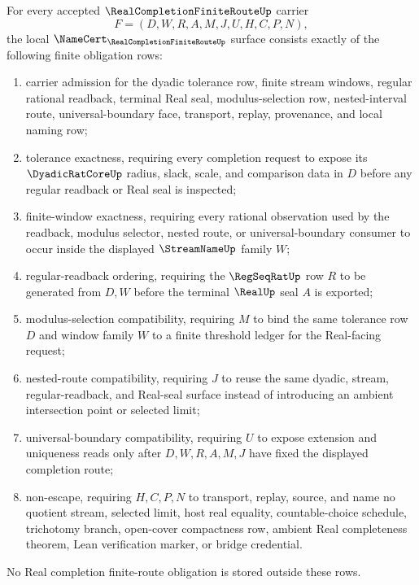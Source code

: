 \begin{theorem}
\label{thm:real-completion-finite-route-namecert-obligations}
For every accepted $\RealCompletionFiniteRouteUp$ carrier
$$
F=(D,W,R,A,M,J,U,H,C,P,N),
$$
the local $\NameCert_{\RealCompletionFiniteRouteUp}$ surface consists exactly of the following finite obligation rows:
\begin{enumerate}
\item carrier admission for the dyadic tolerance row, finite stream windows, regular rational readback, terminal Real seal, modulus-selection row, nested-interval route, universal-boundary face, transport, replay, provenance, and local naming row;
\item tolerance exactness, requiring every completion request to expose its $\DyadicRatCoreUp$ radius, slack, scale, and comparison data in $D$ before any regular readback or Real seal is inspected;
\item finite-window exactness, requiring every rational observation used by the readback, modulus selector, nested route, or universal-boundary consumer to occur inside the displayed $\StreamNameUp$ family $W$;
\item regular-readback ordering, requiring the $\RegSeqRatUp$ row $R$ to be generated from $D,W$ before the terminal $\RealUp$ seal $A$ is exported;
\item modulus-selection compatibility, requiring $M$ to bind the same tolerance row $D$ and window family $W$ to a finite threshold ledger for the Real-facing request;
\item nested-route compatibility, requiring $J$ to reuse the same dyadic, stream, regular-readback, and Real-seal surface instead of introducing an ambient intersection point or selected limit;
\item universal-boundary compatibility, requiring $U$ to expose extension and uniqueness reads only after $D,W,R,A,M,J$ have fixed the displayed completion route;
\item non-escape, requiring $H,C,P,N$ to transport, replay, source, and name no quotient stream, selected limit, host real equality, countable-choice schedule, trichotomy branch, open-cover compactness row, ambient Real completeness theorem, Lean verification marker, or bridge credential.
\end{enumerate}
No Real completion finite-route obligation is stored outside these rows.
\end{theorem}

